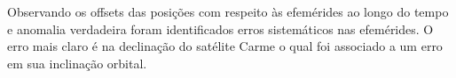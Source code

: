 \documentclass[12pt,a4paper]{report}
\begin{document}

Observando os offsets das posições com respeito às efemérides ao longo do tempo e anomalia verdadeira foram identificados erros sistemáticos nas efemérides. O erro mais claro é na declinação do satélite Carme o qual foi associado a um erro em sua inclinação orbital.

\end{document}
